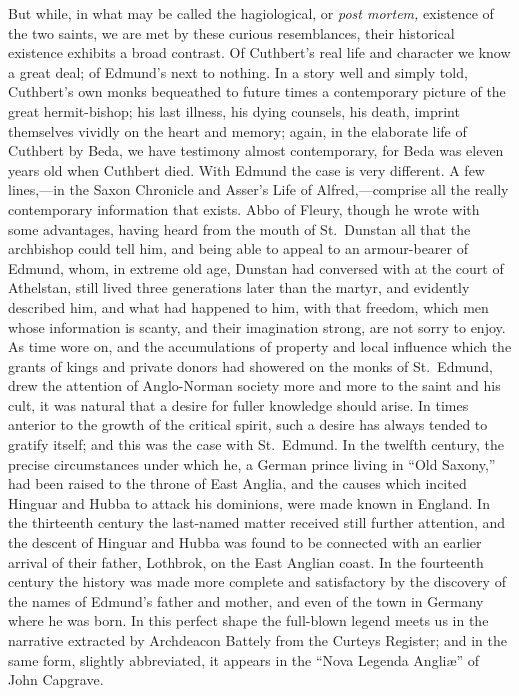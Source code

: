 \documentclass[10pt]{book}
\begin{document}
{But while, in what may be called the hagiological, or \emph{post mortem,} existence of the two saints, we are met by these curious resemblances, their historical existence exhibits a broad contrast. Of Cuthbert's real life and character we know a great deal; of Edmund's next to nothing. In a story well and simply told, Cuthbert's own monks bequeathed to future times a contemporary picture of the great hermit-bishop; his last illness, his dying counsels, his death, imprint themselves vividly on the heart and memory; again, in the elaborate life of Cuthbert by Beda, we have testimony almost contemporary, for Beda was eleven years old when Cuthbert died. With Edmund the case is very different. A few lines,---in the Saxon Chronicle and Asser's Life of Alfred,---comprise all the really contemporary information that exists. Abbo of Fleury, though he wrote with some advantages, having heard from the mouth of St.\ Dunstan all that the archbishop could tell him, and being able to appeal to an armour-bearer of Edmund, whom, in extreme old age, Dunstan had conversed with at the court of Athelstan, still lived three generations later than the martyr, and evidently described him, and what had happened to him, with that freedom, which men whose information is scanty, and their imagination strong, are not sorry to enjoy. As time wore on, and the accumulations of property and local influence which the grants of kings and private donors had showered on the monks of St.\ Edmund, drew the attention of Anglo-Norman society more and more to the saint and his cult, it was natural that a desire for fuller knowledge should arise. In times anterior to the growth of the critical spirit, such a desire has always tended to gratify itself; and this was the case with St.\ Edmund. In the twelfth century, the precise circumstances under which he, a German prince living in ``Old Saxony,'' had been raised to the throne of East Anglia, and the causes which incited Hinguar and Hubba to attack his dominions, were made known in England. In the thirteenth century the last-named matter received still further attention, and the descent of Hinguar and Hubba was found to be connected with an earlier arrival of their father, Lothbrok, on the East Anglian coast. In the fourteenth century the history was made more complete and satisfactory by the discovery of the names of Edmund's father and mother, and even of the town in Germany where he was born. In this perfect shape the full-blown legend meets us in the narrative extracted by Archdeacon Battely from the Curteys Register; and in the same form, slightly abbreviated, it appears in the ``Nova Legenda Angli\ae{}'' of John Capgrave.

}
\end{document}
